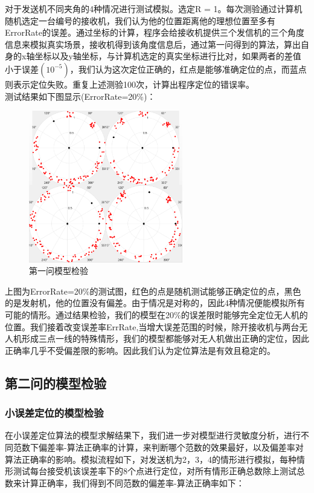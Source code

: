 \documentclass{my_paper}
\begin{document}
对于发送机不同夹角的4种情况进行测试模拟。选定R = 1。每次测验通过计算机随机选定一台编号的接收机，我们认为他的位置距离他的理想位置至多有ErrorRate的误差。通过坐标的计算，程序会给接收机提供三个发信机的三个角度信息来模拟真实场景，接收机得到该角度信息后，通过第一问得到的算法，算出自身的x轴坐标以及y轴坐标，与计算机选定的真实坐标进行比对，如果两者的差值小于误差$(10^{-5})$，我们认为这次定位正确的，红点是能够准确定位的点，而蓝点则表示定位失败。重复上述测验100次，计算出程序定位的错误率。\\
测试结果如下图显示(ErrorRate=20\%)：
\begin{figure}[H]
    \centering
    \includegraphics[width=0.6\textwidth]{check1}
    \caption{第一问模型检验} 
\end{figure}

上图为ErrorRate=20\%的测试图，红色的点是随机测试能够正确定位的点，黑色的是发射机，他的位置没有偏差。由于情况是对称的，因此4种情况便能模拟所有可能的情形。通过结果检验，我们的模型在20\%的误差限时能够完全定位无人机的位置。我们接着改变误差率ErrRate,当增大误差范围的时候，除开接收机与两台无人机形成三点一线的特殊情形，我们的模型都能够对无人机做出正确的定位，因此正确率几乎不受偏差限的影响。因此我们认为定位算法是有效且稳定的。\\

\subsection{第二问的模型检验}
\subsubsection{小误差定位的模型检验}
在小误差定位算法的模型求解结果下，我们进一步对模型进行灵敏度分析，进行不同范数下偏差率-算法正确率的计算，来判断哪个范数的效果最好，以及偏差率对算法正确率的影响。模拟流程如下，对发送机为2，3，4的情形进行模拟，每种情形测试每台接受机该误差率下的8个点进行定位，对所有情形正确总数除上测试总数来计算正确率，我们得到不同范数的偏差率-算法正确率如下：
\end{document}
